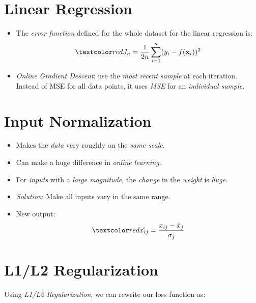 \documentclass[
	title={Linear Regression}
]{cs584notes}
\begin{document}
\section{Linear Regression}\label{sec:linear-regression}
\begin{itemize}
	\item The \emph{error function} defined for the whole dataset for the linear regression is:
	\[ \data{ J_{n} = \frac{1}{2n}\sum_{i=1}^{n} (y_{i} - f(\vec{x}_{i}))^{2} } \]
	\item \emph{Online Gradient Descent}: use the \emph{most recent sample} at each iteration.
	Instead of MSE for all data points, it uses \emph{MSE} for an \emph{individual sample}.
\end{itemize}

\section{Input Normalization}\label{sec:input-normalization}
\begin{itemize}
	\item Makes the \emph{data} very roughly on the \emph{same scale}.
	\item Can make a huge difference in \emph{online learning}.
	\item For \emph{inputs} with a \emph{large magnitude}, the \emph{change} in the \emph{weight} is \emph{huge}.
	\item \emph{Solution}: Make all inputs vary in the same range.
	\item New output:
	\[ \data{ \hat{x_{ij}} = \frac{x_{ij} - \bar{x}_{j}}{\sigma_{j}} } \] %
\end{itemize}

\section{L1/L2 Regularization}\label{sec:l1/l2-regularization}
Using \emph{L1/L2 Regularization}, we can rewrite our loss function as:
\end{document}
